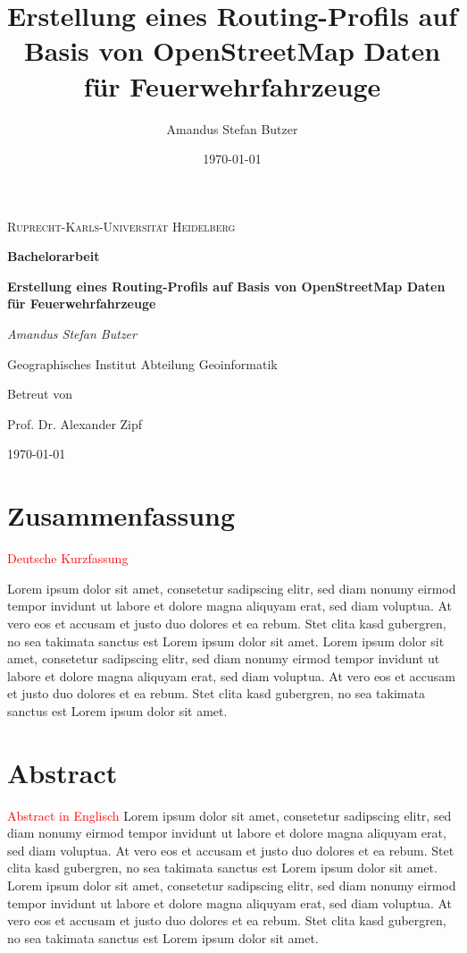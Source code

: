 \documentclass[10pt,a4paper]{article}
\author{Amandus Stefan Butzer}
\title{Erstellung eines Routing-Profils auf Basis von OpenStreetMap Daten für Feuerwehrfahrzeuge}
\date{\today}
\newcommand\todo[1]{\textcolor{red}{#1}}
\begin{document}
\begin{titlepage}
\begin{center}

	{\scshape\LARGE Ruprecht-Karls-Universität Heidelberg\par}
	\vspace{1.5cm}
	{\LARGE\bfseries Bachelorarbeit\par}
	\vspace{2cm}
	{\huge\bfseries Erstellung eines Routing-Profils auf Basis von OpenStreetMap Daten für Feuerwehrfahrzeuge\par}
	\vspace{2cm}
	{\Large\itshape Amandus Stefan Butzer\par}
	\vspace{1.5cm}
	{\large Geographisches Institut Abteilung Geoinformatik\par}
	\vfill
	{Betreut von\par Prof. Dr. Alexander Zipf}

	\vfill

	{\large \today\par}
\end{center}
\end{titlepage}

\newpage

{\centering\section*{Zusammenfassung}}
\todo{Deutsche Kurzfassung}\par
Lorem ipsum dolor sit amet, consetetur sadipscing elitr, sed diam nonumy eirmod tempor invidunt ut labore et dolore magna aliquyam erat, sed diam voluptua. At vero eos et accusam et justo duo dolores et ea rebum. Stet clita kasd gubergren, no sea takimata sanctus est Lorem ipsum dolor sit amet. Lorem ipsum dolor sit amet, consetetur sadipscing elitr, sed diam nonumy eirmod tempor invidunt ut labore et dolore magna aliquyam erat, sed diam voluptua. At vero eos et accusam et justo duo dolores et ea rebum. Stet clita kasd gubergren, no sea takimata sanctus est Lorem ipsum dolor sit amet.

\newpage
{\centering\section*{Abstract}}
\todo{Abstract in Englisch}
Lorem ipsum dolor sit amet, consetetur sadipscing elitr, sed diam nonumy eirmod tempor invidunt ut labore et dolore magna aliquyam erat, sed diam voluptua. At vero eos et accusam et justo duo dolores et ea rebum. Stet clita kasd gubergren, no sea takimata sanctus est Lorem ipsum dolor sit amet. Lorem ipsum dolor sit amet, consetetur sadipscing elitr, sed diam nonumy eirmod tempor invidunt ut labore et dolore magna aliquyam erat, sed diam voluptua. At vero eos et accusam et justo duo dolores et ea rebum. Stet clita kasd gubergren, no sea takimata sanctus est Lorem ipsum dolor sit amet.
\end{document}
